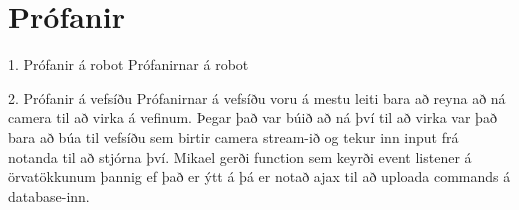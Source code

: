 \section{Prófanir}
1. Prófanir á robot
Prófanirnar á robot 

2. Prófanir á vefsíðu
Prófanirnar á vefsíðu voru á mestu leiti bara að reyna að ná camera til að virka á vefinum. 
Þegar það var búið að ná því til að virka var það bara að búa til vefsíðu sem birtir camera stream-ið og tekur inn input frá notanda til að stjórna því.
Mikael gerði function sem keyrði event listener á örvatökkunum þannig ef það er ýtt á þá er notað ajax til að uploada commands á database-inn.